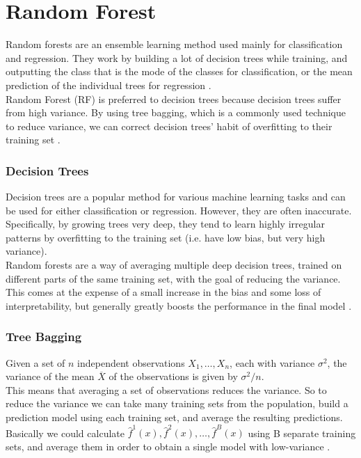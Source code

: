\pagebreak

\section{Random Forest}
Random forests are an ensemble learning method used mainly for classification and regression. They work by building a lot of decision trees while training, and outputting the class that is the mode of the classes for classification, or the mean prediction of the individual trees for regression \cite{wiki:randomforest}. \\

Random Forest (RF) is preferred to decision trees because decision trees suffer from high variance. By using tree bagging, which is a commonly used technique to reduce variance, we can correct decision trees' habit of overfitting to their training set \cite{ESL}.

\subsubsection{Decision Trees}
Decision trees are a popular method for various machine learning tasks and can be used for either classification or regression. However, they are often inaccurate. Specifically, by growing trees very deep, they tend to learn highly irregular patterns by overfitting to the training set (i.e. have low bias, but very high variance). \\
Random forests are a way of averaging multiple deep decision trees, trained on different parts of the same training set, with the goal of reducing the variance. \\
This comes at the expense of a small increase in the bias and some loss of interpretability, but generally greatly boosts the performance in the final model \cite{ESL}. 

\subsubsection{Tree Bagging}
Given a set of $n$ independent observations $X_1, \dots, X_n$, each with variance $\sigma^2$, the variance of the mean $\overline{X}$ of the observations is given by $\sigma^2/n$. \\
This means that averaging a set of observations reduces the variance. So to reduce the variance we can take many training sets from the population, build a prediction model using each training set, and average the resulting predictions. \\
Basically we could calculate $\hat{f}^1(x), \hat{f}^2(x), \dots, \hat{f}^B(x)$ using B separate training sets, and average them in order to obtain a single model with low-variance \cite{ISLR}. \\


